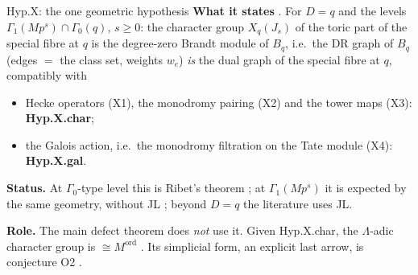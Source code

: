 \begin{frame}{Hyp.X: the one geometric hypothesis}
  \small
  \textbf{What it states} . For $D=q$ and the levels $\Gamma_1(Mp^s)\cap\Gamma_0(q)$, $s\ge0$: the character group
  $X_q(J_s)$ of the toric part of the special fibre at $q$ is the degree-zero Brandt module of $B_q$, i.e.\ the DR graph of $B_q$
  (edges $=$ the class set, weights $w_e$) \emph{is} the dual graph of the special fibre at $q$, compatibly with
  \begin{itemize}\setlength{\itemsep}{0pt}
    \item Hecke operators (X1), the monodromy pairing (X2) and the tower maps (X3): \textbf{Hyp.X.char};
    \item the Galois action, i.e.\ the monodromy filtration on the Tate module (X4): \textbf{Hyp.X.gal}.
  \end{itemize}
  \textbf{Status.} At $\Gamma_0$-type level this is Ribet's theorem ;
  at $\Gamma_1(Mp^s)$ it is expected by the same geometry, without JL ;
  beyond $D=q$ the literature uses JL.

  \textbf{Role.} The main defect theorem does \emph{not} use it. Given Hyp.X.char, the $\Lambda$-adic character group is
  $\cong M^{\mathrm{ord}}$ . Its simplicial form, an explicit last arrow, is conjecture O2 .
\end{frame}
